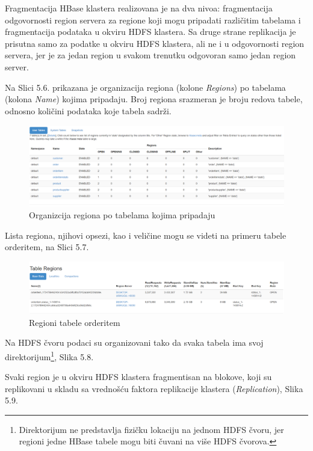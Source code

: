 \documentclass[12pt,oneside]{memoir}
\begin{document}
Fragmentacija HBase klastera realizovana je na dva nivoa:  fragmentacija odgovornosti region servera za regione koji mogu pripadati različitim tabelama i fragmentacija podataka u okviru HDFS klastera. Sa druge strane replikacija je prisutna samo za podatke u okviru HDFS klastera, ali ne i u odgovornosti region servera, jer je za jedan region u svakom trenutku odgovoran samo jedan region server.

Na Slici 5.6. prikazana  je organizacija regiona (kolone \textit{Regions}) po tabelama (kolona \textit{Name}) kojima pripadaju. Broj regiona srazmeran je broju redova tabele, odnosno količini podataka koje tabela sadrži. 

\begin{figure}[!ht]
  \centering
  \includegraphics[width=1\textwidth]{master-dist.png}
  \caption{Organizcija regiona po tabelama kojima pripadaju}
  \label{fig:grafikon}
\end{figure}

Lista regiona, njihovi opsezi, kao i veličine mogu se videti na  primeru tabele orderitem, na Slici 5.7.

\begin{figure}[!ht]
  \centering
  \includegraphics[width=1\textwidth]{orderitem-regions.png}
  \caption{Regioni tabele orderitem}
  \label{fig:grafikon}
\end{figure}


Na HDFS čvoru podaci su organizovani tako da svaka tabela ima svoj direktorijum\footnote{Direktorijum ne predstavlja fizičku lokaciju na jednom HDFS čvoru, jer regioni jedne HBase tabele mogu biti čuvani na više HDFS čvorova.}, Slika 5.8.

Svaki region je u okviru HDFS klastera fragmentisan na blokove, koji su replikovani u skladu sa vrednošću faktora replikacije klastera (\textit{Replication}), Slika 5.9.
\end{document}
